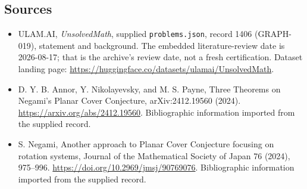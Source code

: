 \documentclass[11pt,a4paper]{article}
\begin{document}
\subsection{Sources}

{\small

\begin{itemize}

\item[\hypertarget{source:1406:1}{S1}] ULAM.AI, \emph{UnsolvedMath}, supplied \texttt{problems.json}, record 1406 (GRAPH-019), statement and background. The embedded literature-review date is 2026-08-17; that is the archive’s review date, not a fresh certification. Dataset landing page: \url{https://huggingface.co/datasets/ulamai/UnsolvedMath}.

\item[\hypertarget{source:1406:2}{S2}] D. Y. B. Annor, Y. Nikolayevsky, and M. S. Payne, Three Theorems on Negami's Planar Cover Conjecture, arXiv:2412.19560 (2024). \url{https://arxiv.org/abs/2412.19560}. Bibliographic information imported from the supplied record.

\item[\hypertarget{source:1406:3}{S3}] S. Negami, Another approach to Planar Cover Conjecture focusing on rotation systems, Journal of the Mathematical Society of Japan 76 (2024), 975–996. \url{https://doi.org/10.2969/jmsj/90769076}. Bibliographic information imported from the supplied record.

\end{itemize}

}

\label{end:1406}
\end{document}
